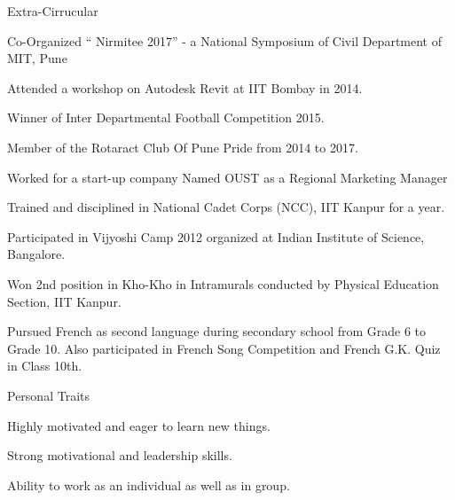 \documentclass{resume} %
\begin{document}


\begin{rSection}{Extra-Cirrucular} \itemsep -3pt
\item Co-Organized “ Nirmitee 2017” - a National Symposium of Civil Department of MIT, Pune
\item Attended a workshop on Autodesk Revit at IIT Bombay in 2014.
\item Winner of Inter Departmental Football Competition 2015.
\item Member of the  Rotaract Club Of Pune Pride from 2014 to 2017.
\item Worked for a start-up company Named OUST as a Regional Marketing Manager
\item Trained and disciplined in National Cadet Corps (NCC), IIT Kanpur for a year.
 \item  Participated in Vijyoshi Camp 2012 organized at Indian Institute of Science, Bangalore.
 \item Won 2nd position in Kho-Kho in Intramurals conducted by Physical Education Section, IIT Kanpur.
 \item Pursued French as second language during secondary school from Grade 6 to Grade 10. Also participated in French Song Competition and French G.K. Quiz in Class 10th. %

\end{rSection}

\begin{rSection}{Personal Traits}
\item Highly motivated and eager to learn new things.
\item Strong motivational and leadership skills.
\item Ability to work as an individual as well as in group.
\end{rSection}
\end{document}
